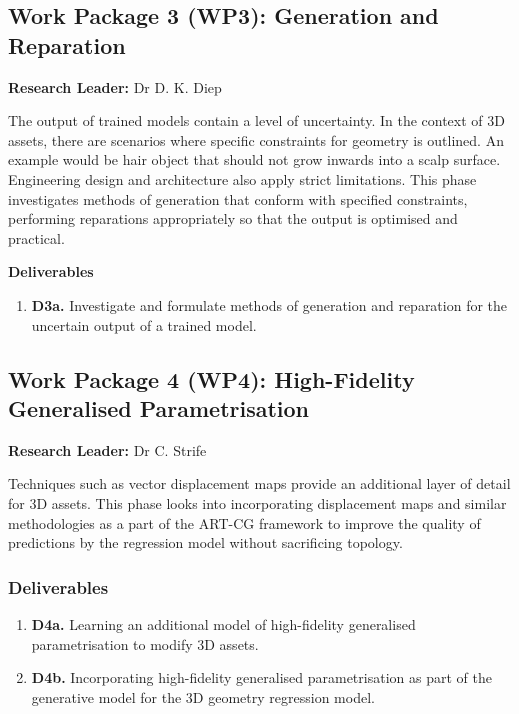 \documentclass[a4paper, fontsize=15pt, onecolumn]{article} %
\numberwithin{equation}{section} %
\numberwithin{figure}{section} %
\numberwithin{table}{section} %
\begin{document}
\subsection{Work Package 3 (WP3): Generation and Reparation}
\textbf{Research Leader:} Dr D. K. Diep\par

The output of trained models contain a level of uncertainty. In the context of 3D assets, there are scenarios where specific constraints for geometry is outlined. An example would be hair object that should not grow inwards into a scalp surface. Engineering design and architecture also apply strict limitations. This phase investigates methods of generation that conform with specified constraints, performing reparations appropriately so that the output is optimised and practical.

\textbf{Deliverables}
\begin{enumerate}
	\item \textbf{D3a.} Investigate and formulate methods of generation and reparation for the uncertain output of a trained model.
\end{enumerate}

\subsection{Work Package 4 (WP4): High-Fidelity Generalised Parametrisation}
\textbf{Research Leader:} Dr C. Strife\par

Techniques such as vector displacement maps provide an additional layer of detail for 3D assets. This phase looks into incorporating displacement maps and similar methodologies as a part of the ART-CG framework to improve the quality of predictions by the regression model without sacrificing topology.

\subsubsection{Deliverables}
\begin{enumerate}
	\item \textbf{D4a.} Learning an additional model of high-fidelity generalised parametrisation to modify 3D assets.
	\item \textbf{D4b.} Incorporating high-fidelity generalised parametrisation as part of the generative model for the 3D geometry regression model.
\end{enumerate}
\end{document}
